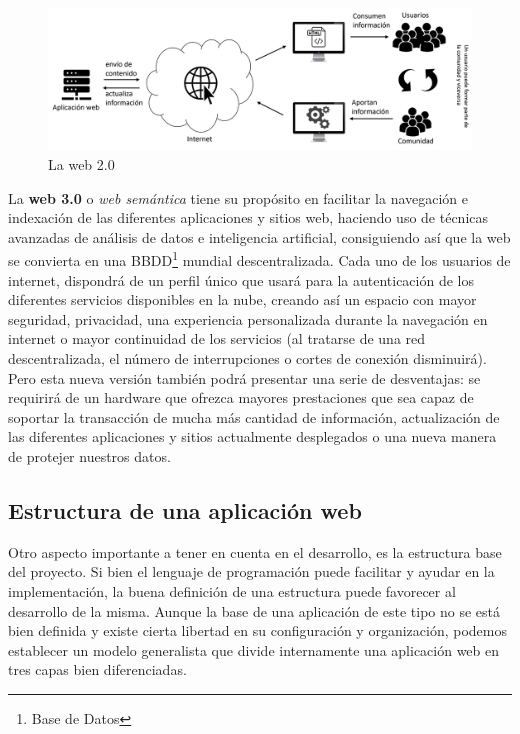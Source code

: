 \documentclass[../main.tex]{subfiles}
\begin{document}
     \begin{figure}[!h]
          \centering
          \includegraphics[width=\textwidth]{images/web2.0.png}
          \caption{La web 2.0}
          \label{fig:web2.0}
      \end{figure}

    La \textbf{web 3.0} o \textit{web semántica} tiene su propósito en facilitar la navegación e indexación de las diferentes aplicaciones y sitios web, haciendo uso de técnicas avanzadas de análisis de datos e inteligencia artificial, consiguiendo así que la web se convierta en una BBDD\footnote{Base de Datos} mundial descentralizada. Cada uno de los usuarios de internet, dispondrá de un perfil único que usará para la autenticación de los diferentes servicios disponibles en la nube, creando así un espacio con mayor seguridad, privacidad, una experiencia personalizada durante la navegación en internet o mayor continuidad de los servicios (al tratarse de una red descentralizada, el número de interrupciones o cortes de conexión disminuirá). Pero esta nueva versión también podrá presentar una serie de desventajas: se requirirá de un hardware que ofrezca mayores prestaciones que sea capaz de soportar la transacción de mucha más cantidad de información, actualización de las diferentes aplicaciones y sitios actualmente desplegados o una nueva manera de protejer nuestros datos.  
    
    
    
    
    \subsection{Estructura de una aplicación web}
    
    Otro aspecto importante a tener en cuenta en el desarrollo, es la estructura base del proyecto. Si bien el lenguaje de programación puede facilitar y ayudar en la implementación, la buena definición de una estructura puede favorecer al desarrollo de la misma. Aunque la base de una aplicación de este tipo no se está bien definida y existe cierta libertad en su configuración y organización, podemos establecer un modelo generalista que divide internamente una aplicación web en tres capas bien diferenciadas.
    
\end{document}

